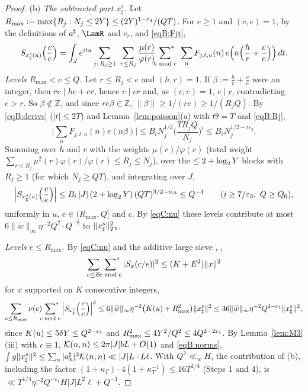 \begin{proof}
(b) \emph{The subtracted part $x_\sharp^s$.} Let $R_{\max}:=\max\{R_j:N_j\le2Y\}\le(2Y)^{1-\varepsilon_3}/(QT)$. For $e\ge1$ and $(c,e)=1$,
by the definitions of $a^\sharp$, $\LamR$ and $c_r$, and \eqref{eqB:Fjt},
\begin{equation}\label{eqC:Ssharp}
 S_{x_\sharp^s(u)}\Big(\frac ce\Big)=\int_Je^{itu}\sum_{j:\,R_j\ge1}\ \sum_{r\le R_j}\frac{\mu(r)}{\varphi(r)}\sumst_{h\bmod r}\ \sum_nF_{j,t,u}(n)\,
 e\Big(n\Big(\frac hr+\frac ce\Big)\Big)\,dt .
\end{equation}
\emph{Levels $R_{\max}<e\le Q$.} Let $r\le R_j<e$ and $(h,r)=1$. If $\beta:=\frac hr+\frac ce$ were an integer, then $re\mid he+cr$, hence $e\mid cr$
and, as $(c,e)=1$, $e\mid r$, contradicting $e>r$. So $\beta\notin\mathbb Z$, and since $re\beta\in\mathbb Z$, $\|\beta\|\ge1/(re)\ge1/(R_jQ)$. By
\eqref{eqB:derivs} ($|t|\le2T$) and Lemma~\ref{lem:poisson}(a) with $\Theta=T$ and \eqref{eqB:Rj},
\[
 \Big|\sum_nF_{j,t,u}(n)e(n\beta)\Big|\le B_iN_j^{1/2}\Big(\frac{TR_jQ}{N_j}\Big)^i\le B_iN_j^{1/2-i\varepsilon_3}.
\]
Summing over $h$ and $r$ with the weights $\mu(r)/\varphi(r)$ (total weight $\sum_{r\le R_j}\mu^2(r)\varphi(r)/\varphi(r)\le R_j\le N_j$), over the $\le2+\log_2Y$ blocks with
$R_j\ge1$ (for which $N_j\ge QT$), and integrating over $J$,
\[
 \Big|S_{x_\sharp^s(u)}\Big(\frac ce\Big)\Big|\le B_i\,|J|\,(2+\log_2Y)\,(QT)^{3/2-i\varepsilon_3}\le Q^{-4}\qquad(i\ge7/\varepsilon_3,\ Q\ge Q_0),
\]
uniformly in $u$, $e\in(R_{\max},Q]$ and $c$. By \eqref{eqC:nu} these levels contribute at most $6\|\widetilde w\|_\infty\eta^{-2}Q^2\cdot Q^{-8}$ to
$\|x_\sharp^s\|_{T^\natural}^2$.

\emph{Levels $e\le R_{\max}$.} By \eqref{eqC:nu} and the additive large sieve \cite{MV73}, \cite[Thm.~7.7]{IK04},
\[
 \sum_{e\le E}\sideset{}{^*}\sum_{c\bmod e}|S_x(c/e)|^2\le(K+E^2)\|x\|^2
\]
for $x$ supported on $K$ consecutive integers,
\[
 \sum_{e\le R_{\max}}\nu(e)\sideset{}{^*}\sum_{c\bmod e}\Big|S_{x_\sharp^s}\Big(\frac ce\Big)\Big|^2\le6\|\widetilde w\|_\infty\eta^{-2}\big(K(u)+R_{\max}^2\big)\|x_\sharp^s\|^2
 \le36\|\widetilde w\|_\infty\eta^{-2}Q^{2-\varepsilon_1}\|x_\sharp^s\|^2,
\]
since $K(u)\le5\delta Y\le Q^{2-\varepsilon_1}$ and $R_{\max}^2\le4Y^2/Q^2\le4Q^{2-2\varepsilon_1}$. By Lemma~\ref{lem:M3}(iii) with $c\equiv1$,
$\mathcal{K}(n,n)\le2\pi|J|bL+O(1)$ and \eqref{eqB:norms}, $\int g\|x_\sharp^s\|^2\le\sum_n|a^\sharp_n|^2\mathcal{K}(n,n)\ll|J|L\cdot L\ell$. With $Q^2\ll_wH$, the
contribution of (b), including the factor $(1+\kappa_T)\cdot4(1+\kappa_T^{-1})\le16T^{1/4}$ (Steps 1 and 4), is $\ll T^{1/4}\eta^{-2}Q^{-\varepsilon_1}H|J|L^2\ell+Q^{-1}$.


\end{proof}
